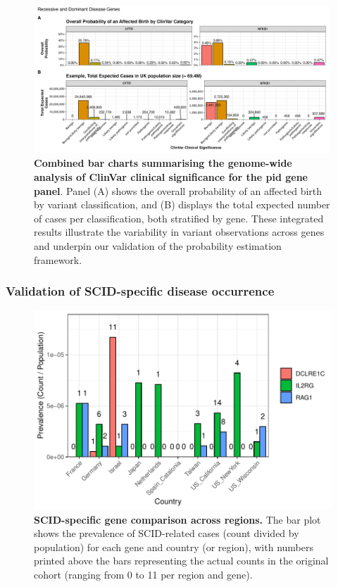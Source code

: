 \begin{figure}[ht]
  \centering
  \includegraphics[width=0.99\textwidth]{../images/all_genes_combined_bar_charts_mini.png}
  \caption{\textbf{Combined bar charts summarising the genome-wide analysis of ClinVar clinical significance for the \ac{pid} gene panel}. Panel (A) shows the overall probability of an affected birth by variant classification, and (B) displays the total expected number of cases per classification, both stratified by gene. These integrated results illustrate the variability in variant observations across genes and underpin our validation of the probability estimation framework.}
  \label{fig:all_genes_combined_bar_charts_mini}
\end{figure}

\subsubsection{Validation of SCID-specific disease occurrence}
\begin{figure}[ht]
  \centering
  \includegraphics[width=.75\textwidth]{../images/validation_studies_scid_gene_comparison.pdf}
  \caption{\textbf{SCID-specific gene comparison across regions.} The bar plot shows the prevalence of SCID-related cases (count divided by population) for each gene and country (or region), with numbers printed above the bars representing the actual counts in the original cohort (ranging from 0 to 11 per region and gene).}
  \label{fig:scid_gene_comparison}
\end{figure}

